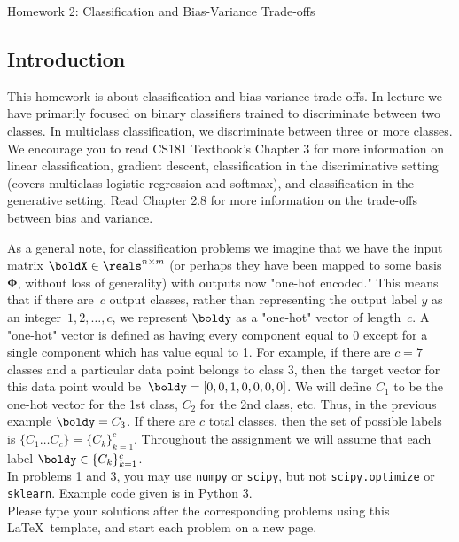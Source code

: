 \documentclass[submit]{harvardml}
\begin{document}
\begin{center}
{\Large Homework 2: Classification and Bias-Variance Trade-offs}\\
\end{center}

\subsection*{Introduction}

This homework is about classification and bias-variance trade-offs. In
lecture we have primarily focused on binary classifiers trained to
discriminate between two classes. In multiclass classification, we
discriminate between three or more classes. We encourage you
to read CS181 Textbook's Chapter 3 for more information on linear
classification, gradient descent, classification in the discriminative
setting (covers multiclass logistic regression and softmax), and
classification in the generative setting. Read Chapter 2.8 for more
information on the trade-offs between bias and variance.

As a general note, for classification problems we imagine that we have the input matrix $\boldX \in
\reals^{n \times m}$ (or perhaps they have been mapped to some basis
$\bm{\Phi}$, without loss of generality) with outputs now
"one-hot encoded."  This means that if there are~$c$ output
classes, rather than representing the output label $y$ as an
integer~${1,2,\ldots,c}$, we represent $\boldy$ as a "one-hot" vector of
length~$c$. A "one-hot" vector is defined as having every component equal to 0 except for 
a single component which has value equal to 1.
For example, if there are $c = 7$ classes and a particular data point belongs to class 3, 
then the target vector for this data point would be~$\boldy = [0,0,1,0,0,0,0]$.
We will define $C_1$ to be the one-hot vector for the 1st class, $C_2$ for the 2nd class, etc.
Thus, in the previous example $\boldy = C_3$. If there are $c$ total classes, then the set of
possible labels is $\{C_1 \ldots C_c \} = \{C_k\}_{k=1}^c$.
Throughout the assignment we will assume
that each label $\boldy \in \{C_k\}_{k=1}^c$.\\

In problems 1 and 3, you may use \texttt{numpy} or
\texttt{scipy}, but not \texttt{scipy.optimize} or \texttt{sklearn}. Example code given is in Python 3. \\

Please type your solutions after the corresponding problems using this
\LaTeX\ template, and start each problem on a new page.\\
\end{document}
